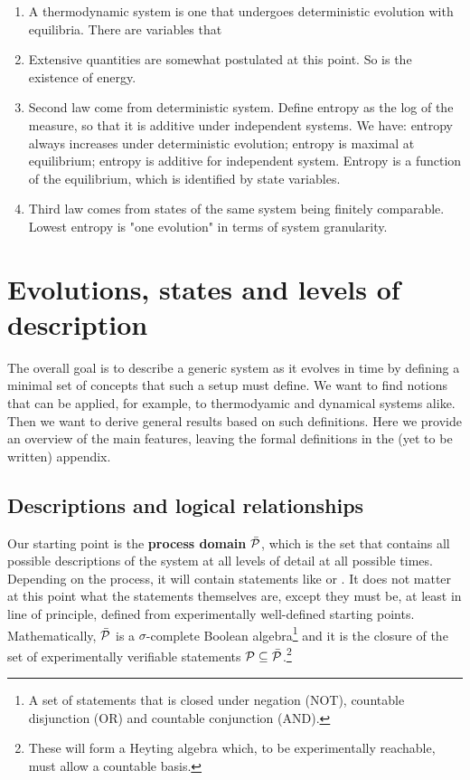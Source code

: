 \documentclass[letterpaper]{article}
\begin{document}
\begin{enumerate}
	\item A thermodynamic system is one that undergoes deterministic evolution with equilibria. There are variables that  
	\item Extensive quantities are somewhat postulated at this point. So is the existence of energy.
	\item Second law come from deterministic system.  Define entropy as the log of the measure, so that it is additive under independent systems. We have: entropy always increases under deterministic evolution; entropy is maximal at equilibrium; entropy is additive for independent system. Entropy is a function of the equilibrium, which is identified by state variables.
	\item Third law comes from states of the same system being finitely comparable. Lowest entropy is "one evolution" in terms of system granularity.
	
\end{enumerate}


\section{Evolutions, states and levels of description}

The overall goal is to describe a generic system as it evolves in time by defining a minimal set of concepts that such a setup must define. We want to find notions that can be applied, for example, to thermodyamic and dynamical systems alike. Then we want to derive general results based on such definitions. Here we provide an overview of the main features, leaving the formal definitions in the (yet to be written) appendix.

\subsection{Descriptions and logical relationships}

Our starting point is the \textbf{process domain} $\tdomain[P]$, which is the set that contains all possible descriptions of the system at all levels of detail at all possible times. Depending on the process, it will contain statements like  or . It does not matter at this point what the statements themselves are, except they must be, at least in line of principle, defined from experimentally well-defined starting points. Mathematically, $\tdomain[P]$ is a $\sigma$-complete Boolean algebra\footnote{A set of statements that is closed under negation (NOT), countable disjunction (OR) and countable conjunction (AND).} and it is the closure of the set of experimentally verifiable statements $\edomain[P] \subseteq \tdomain[P]$.\footnote{These will form a Heyting algebra which, to be experimentally reachable, must allow a countable basis.}
\end{document}
